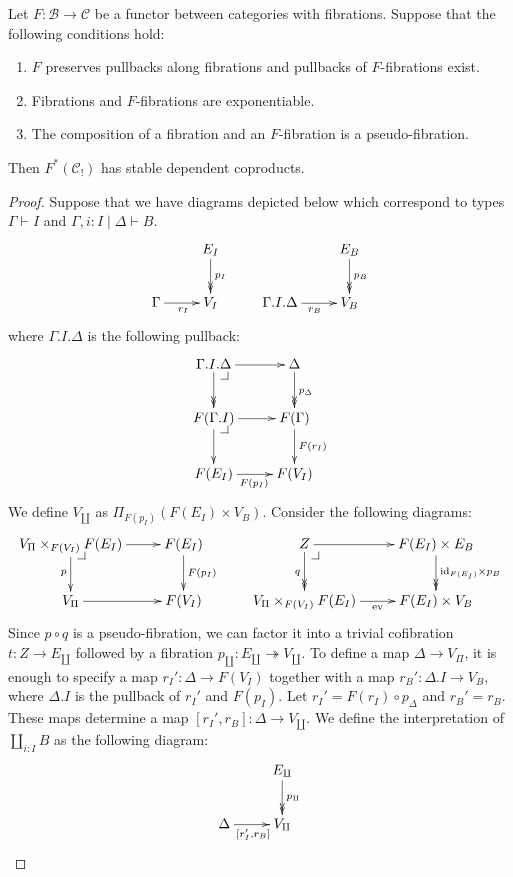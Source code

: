 \documentclass[reqno]{amsart}
\makeatletter
\theoremstyle{definition}
\theoremstyle{remark}
\newcommand{\fs}[1]{\mathrm{#1}}
\newcommand{\scat}[1]{\mathcal{#1}}
\newcommand{\id}{\fs{id}}
\numberwithin{figure}{section}
\newcommand{\pb}[1][dr]{\save*!/#1-1.2pc/#1:(-1,1)@^{|-}\restore}
\makeatother
\begin{document}
\begin{prop}[coproducts]
Let $F : \scat{B} \to \scat{C}$ be a functor between categories with fibrations.
Suppose that the following conditions hold:
\begin{enumerate}
\item $F$ preserves pullbacks along fibrations and pullbacks of $F$-fibrations exist.
\item Fibrations and $F$-fibrations are exponentiable.
\item The composition of a fibration and an $F$-fibration is a pseudo-fibration.
\end{enumerate}
Then $F^*(\scat{C}_!)$ has stable dependent coproducts.
\end{prop}
\begin{proof}
Suppose that we have diagrams depicted below which correspond to types $\Gamma \vdash I$ and $\Gamma, i : I \mid \Delta \vdash B$.
\[ \xymatrix{                       & E_I \ar@{->>}[d]^{p_I} \\
              \Gamma \ar[r]_{r_I}   & V_I
            } \qquad
   \xymatrix{                               & E_B \ar@{->>}[d]^{p_B} \\
              \Gamma.I.\Delta \ar[r]_{r_B}  & V_B
            } \]
where $\Gamma.I.\Delta$ is the following pullback:
\[ \xymatrix{ \Gamma.I.\Delta \ar[r] \ar@{->>}[d] \pb   & \Delta \ar@{->>}[d]^{p_\Delta} \\
              F(\Gamma.I) \ar[r] \ar[d] \pb             & F(\Gamma) \ar[d]^{F(r_I)} \\
              F(E_I) \ar[r]_{F(p_I)}                    & F(V_I)
            } \]
We define $V_\amalg$ as $\Pi_{F(p_I)}(F(E_I) \times V_B)$.
Consider the following diagrams:
\[ \xymatrix{ V_\Pi \times_{F(V_I)} F(E_I) \ar[r] \ar[d]_p \pb  & F(E_I) \ar[d]^{F(p_I)} \\
              V_\Pi \ar[r]                                      & F(V_I)
            } \qquad
   \xymatrix{ Z \ar[r] \ar@{->>}[d]_q \pb                       & F(E_I) \times E_B \ar@{->>}[d]^{\id_{F(E_I)} \times p_B} \\
              V_\Pi \times_{F(V_I)} F(E_I) \ar[r]_-{\fs{ev}}    & F(E_I) \times V_B
            } \]
Since $p \circ q$ is a pseudo-fibration, we can factor it into a trivial cofibration $t : Z \to E_\amalg$ followed by a fibration $p_\amalg : E_\amalg \twoheadrightarrow V_\amalg$.
To define a map $\Delta \to V_\Pi$, it is enough to specify a map $r_I' : \Delta \to F(V_I)$ together with a map $r_B' : \Delta.I \to V_B$, where $\Delta.I$ is the pullback of $r_I'$ and $F(p_I)$.
Let $r_I' = F(r_I) \circ p_\Delta$ and $r_B' = r_B$.
These maps determine a map $[r_I',r_B] : \Delta \to V_\amalg$.
We define the interpretation of $\coprod_{i : I} B$ as the following diagram:
\[ \xymatrix{                               & E_\amalg \ar@{->>}[d]^{p_\amalg} \\
              \Delta \ar[r]_{[r_I',r_B]}    & V_\amalg
            } \]


\end{proof}
\end{document}
